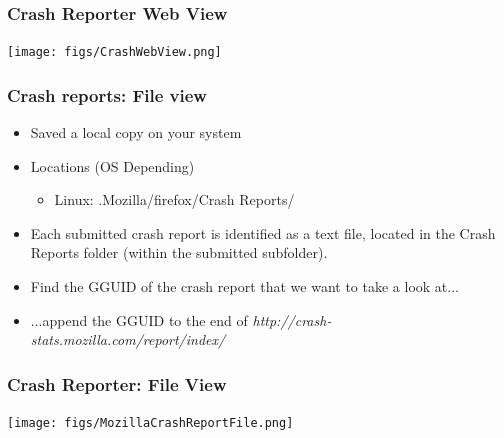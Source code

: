 \documentclass{beamer}
\begin{document}

\begin{frame}
\frametitle{Crash Reporter Web View}
\begin{center}
 \texttt{[image: figs/CrashWebView.png]}
\begin{figure}
\end{figure}
\end{center}
\end{frame}


\begin{frame}
\frametitle{Crash reports: File view}
 \begin{itemize}
 \item Saved a local copy on your system
  \item Locations (OS Depending)
    \begin{itemize}
      \item Linux: .Mozilla/firefox/Crash Reports/
    \end{itemize}
  \item Each submitted crash report is identified as a text file, located in the Crash Reports folder (within the submitted subfolder).
  \item Find the GGUID of the crash report that we want to take a look at...
  \item ...append the GGUID to the end of \textit{http://crash-stats.mozilla.com/report/index/}
 \end{itemize}
\end{frame}



\begin{frame}
\frametitle{Crash Reporter: File View}
\begin{center}
 \texttt{[image: figs/MozillaCrashReportFile.png]}
\begin{figure}
\end{figure}
\end{center}
\end{frame}

\end{document}
